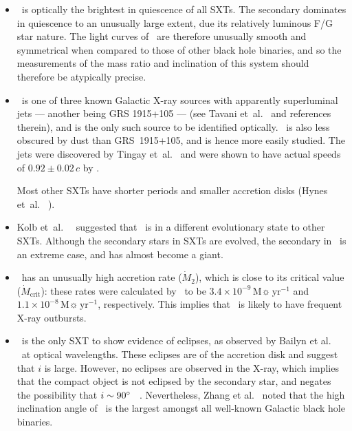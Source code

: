 \begin{itemize}

\item %
\groj\ is optically the brightest in quiescence of all SXTs. %
The secondary dominates in quiescence to an unusually large extent,
due its relatively luminous F/G star nature.
The light curves of \groj\ are therefore unusually smooth and
symmetrical when compared to those of other black hole binaries, and
so the measurements of the mass ratio and inclination of this system
should therefore be atypically precise. %

\item
\groj\ is one of three known Galactic X-ray sources with apparently superluminal
jets --- another being GRS 1915+105 --- (see Tavani et~al.\ %
and references therein), and is the only such source to be identified
optically. \groj\ is also less obscured by dust than \mbox{GRS 1915+105}, and is hence more easily studied.
The jets were discovered by Tingay et~al.\ %
\citeyear{Tingay_et_al.:1995} %
and were shown to have actual speeds of $0.92 \pm 0.02\,c$ by %
. %

Most other SXTs have shorter periods and smaller accretion disks %
(Hynes et~al.\ %
).%

\item Kolb et~al.\ %
\citeyear{Kolb_et_al.:1997}%
\ suggested that \groj\ is in a different evolutionary state to other
SXTs. %
Although the secondary stars in SXTs are evolved, the secondary in
\groj\ is an extreme case, and has almost become a giant. %

\item
\groj\ has an unusually high accretion rate ($\dot{M}_{2}$), which
is close to its critical value ($\dot{M}_{\mathrm{crit}}$): these
rates were calculated by %
%
\ to be $3.4\times10^{-9}\,\mathrm{M}\sun\,\mathrm{yr}^{-1}$ and
$1.1\times10^{-8}\,\mathrm{M}\sun\,\mathrm{yr}^{-1}$,
respectively. This implies that \groj\ is likely to have frequent
X-ray outbursts. %



\item \groj\ is the only SXT to show evidence of eclipses, as observed by
Bailyn et al.\ %
\citeyear{BailynOroszGirad_et_al.:1995}%
\ at optical wavelengths. These eclipses are of the
accretion disk and suggest that $i$ is large. However, no eclipses are
observed in the X-ray, which implies that the compact object is not
eclipsed by the secondary star, and negates the possibility that
$i\sim90\hbox{$^\circ$}$~\cite{OroszBailyn:1997}%
. Nevertheless, Zhang et al.\ %
\citeyear{Zhang_et_al.:1997} %
noted that the high inclination angle of \groj\ is the largest amongst
all well-known Galactic black hole binaries. %


\end{itemize}
